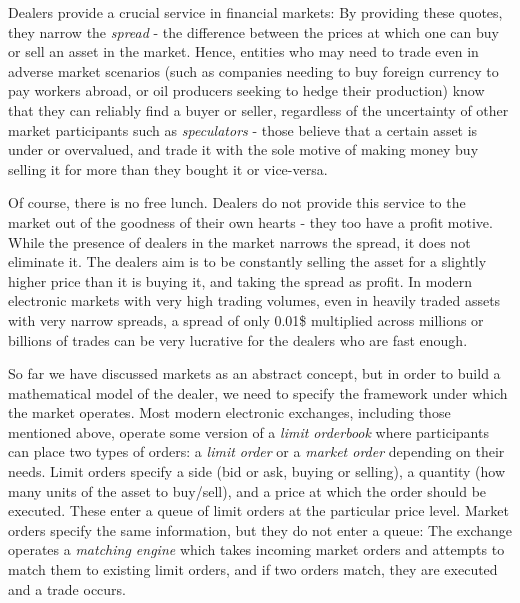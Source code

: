 Dealers provide a crucial service in financial markets: By providing these quotes, 
they narrow the \textit{spread} - the difference between the prices at which one can buy or sell an asset in the market. 
Hence, entities who may need to trade even in adverse market scenarios (such as companies needing to buy foreign currency to pay workers abroad, 
or oil producers seeking to hedge their production) know that they can reliably find a buyer or seller, 
regardless of the uncertainty of other market participants such as \textit{speculators} - those believe that a certain asset is under or overvalued, 
and trade it with the sole motive of making money buy selling it for more than they bought it or vice-versa.

Of course, there is no free lunch. Dealers do not provide this service to the market out of the goodness of their own hearts - they too have a profit motive. 
While the presence of dealers in the market narrows the spread, it does not eliminate it. 
The dealers aim is to be constantly selling the asset for a slightly higher price than it is buying it, and taking the spread as profit. 
In modern electronic markets with very high trading volumes, even in heavily traded assets with very narrow spreads, a spread of only 0.01\$ 
multiplied across millions or billions of trades can be very lucrative for the dealers who are fast enough.

So far we have discussed markets as an abstract concept, but in order to build a mathematical model of the dealer, 
we need to specify the framework under which the market operates. Most modern electronic exchanges, including those mentioned above, 
operate some version of a \textit{limit orderbook} where participants can place two types of orders: a \textit{limit order} or a \textit{market order} 
depending on their needs. Limit orders specify a side (bid or ask, buying or selling), a quantity (how many units of the asset to buy/sell), 
and a price at which the order should be executed. These enter a queue of limit orders at the particular price level. 
Market orders specify the same information, but they do not enter a queue: 
The exchange operates a \textit{matching engine} which takes incoming market orders and attempts to match them to existing limit orders, 
and if two orders match, they are executed and a trade occurs. 

